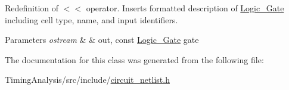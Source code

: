 Redefinition of $<$$<$ operator. Inserts formatted description of \hyperlink{structCircuit__Netlist_1_1Logic__Gate}{Logic\-\_\-\-Gate} including cell type, name, and input identifiers. 


\begin{DoxyParams}{Parameters}
{\em ostream} & \& out, const \hyperlink{structCircuit__Netlist_1_1Logic__Gate}{Logic\-\_\-\-Gate} gate \\
\hline
\end{DoxyParams}


The documentation for this class was generated from the following file\-:\begin{DoxyCompactItemize}
\item 
Timing\-Analysis/src/include/\hyperlink{circuit__netlist_8h}{circuit\-\_\-netlist.\-h}\end{DoxyCompactItemize}
